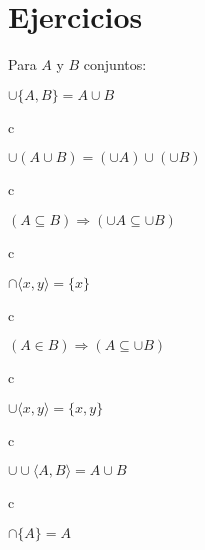 





\section{Ejercicios}
Para $A$ y  $B$ conjuntos:
\begin{problema}
$\cup\{A, B\}=A \cup B$
\end{problema}

\begin{dem}
	c
\end{dem}
\begin{problema}
 $\cup(A \cup B)=(\cup A) \cup(\cup B)$
\end{problema}

\begin{dem}
	c
\end{dem}
\begin{problema}
$(A \subseteq B) \Rightarrow(\cup A \subseteq \cup B)$
\end{problema}

\begin{dem}
	c
\end{dem}
\begin{problema}
	$\cap\langle x, y\rangle=\{x\}$
\end{problema}

\begin{dem}
	c
\end{dem}
\begin{problema}
	$(A \in B) \Rightarrow(A \subseteq \cup B)$
\end{problema}

\begin{dem}
	c
\end{dem}
\begin{problema}
	$\cup\langle x, y\rangle=\{x, y\}$
\end{problema}

\begin{dem}
	c
\end{dem}
\begin{problema}
	$\cup \cup \langle A, B\rangle=A \cup B$
\end{problema}

\begin{dem}
	c
\end{dem}
\begin{problema}
	$\cap\{A\}=A$
\end{problema}

